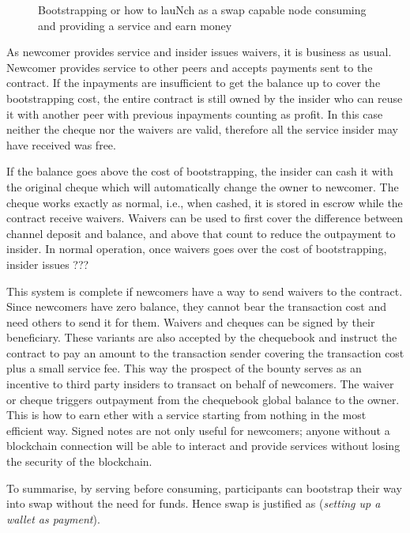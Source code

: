 \begin{center}
\begin{figure}
\begin{center}
\end{center}
\caption{Bootstrapping or how to lauNch as a swap capable node consuming and providing a
service  and earn money}
\label{fig:bootstrapping}
\end{figure}
\end{center}


As newcomer provides service and insider issues waivers, it is business as usual.
Newcomer provides service to other peers and accepts payments sent to the
contract. If the inpayments are insufficient to get the balance up
to cover the bootstrapping cost, the entire contract is still owned by the insider
who can reuse it with another peer with previous inpayments counting as profit.
In this case neither the cheque nor the waivers are valid, therefore all the service insider
may have received was free.

If the balance goes above the cost of bootstrapping, the insider can cash it with
the original cheque which will automatically change the owner to newcomer.
The cheque works exactly as normal, i.e., when cashed, it is stored in escrow
while the contract receive waivers.
Waivers can be used to first cover the difference between channel deposit and balance, and above that
count to reduce the outpayment to insider. In normal operation, once waivers goes over
the cost of bootstrapping, insider issues ???

This system is complete if newcomers have a way to send waivers to the contract.
Since newcomers have zero balance, they cannot bear the transaction   cost and need others to send it for them. 
Waivers and cheques can be signed by their beneficiary. These variants are also accepted by the chequebook
and instruct the contract to pay an amount to the transaction sender covering the transaction cost plus a small service fee.  This way the prospect of the bounty serves as an incentive to
third party insiders to transact on behalf of newcomers.
The waiver or cheque triggers outpayment from the chequebook global  balance to the owner.
This is how to earn ether with a service starting from nothing in the most efficient way.
Signed notes are not only useful for newcomers; anyone without a blockchain connection
will be able to interact and provide services without losing the security of the blockchain.

To summarise, by serving before consuming, participants can
bootstrap their way into swap without the need for funds.
Hence swap is justified as (\emph{setting up a wallet as payment}).
